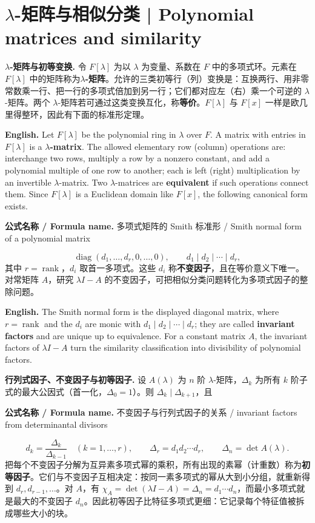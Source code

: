 \documentclass[UTF8,11pt,a4paper]{ctexart}
\newcommand{\EN}[1]{\par\noindent\textbf{English.} #1\par}
\newcommand{\FORMULA}[2]{\par\noindent\textbf{公式名称 / Formula name.} #1 / #2\par}
\begin{document}
\section[\texorpdfstring{$\lambda$}{lambda}-矩阵与相似分类]{\texorpdfstring{$\lambda$}{lambda}-矩阵与相似分类 | Polynomial matrices and similarity}
\noindent\textbf{$\lambda$-矩阵与初等变换.} 令 $F[\lambda]$ 为以 $\lambda$ 为变量、系数在 $F$ 中的多项式环。元素在 $F[\lambda]$ 中的矩阵称为\textbf{$\lambda$-矩阵}。允许的三类初等行（列）变换是：互换两行、用非零常数乘一行、把一行的多项式倍加到另一行；它们都对应左（右）乘一个可逆的 $\lambda$-矩阵。两个 $\lambda$-矩阵若可通过这类变换互化，称\textbf{等价}。$F[\lambda]$ 与 $F[x]$ 一样是欧几里得整环，因此有下面的标准形定理。
\EN{Let $F[\lambda]$ be the polynomial ring in $\lambda$ over $F$. A matrix with entries in $F[\lambda]$ is a \textbf{$\lambda$-matrix}. The allowed elementary row (column) operations are: interchange two rows, multiply a row by a nonzero constant, and add a polynomial multiple of one row to another; each is left (right) multiplication by an invertible $\lambda$-matrix. Two $\lambda$-matrices are \textbf{equivalent} if such operations connect them. Since $F[\lambda]$ is a Euclidean domain like $F[x]$, the following canonical form exists.}
\FORMULA{多项式矩阵的 Smith 标准形}{Smith normal form of a polynomial matrix}
\[
\operatorname{diag}(d_1,\dots,d_r,0,\dots,0),\qquad d_1\mid d_2\mid\cdots\mid d_r,
\]
其中 $r=\operatorname{rank}$，$d_i$ 取首一多项式。这些 $d_i$ 称\textbf{不变因子}，且在等价意义下唯一。对常矩阵 $A$，研究 $\lambda I-A$ 的不变因子，可把相似分类问题转化为多项式因子的整除问题。
\EN{The Smith normal form is the displayed diagonal matrix, where $r=\operatorname{rank}$ and the $d_i$ are monic with $d_1\mid d_2\mid\cdots\mid d_r$; they are called \textbf{invariant factors} and are unique up to equivalence. For a constant matrix $A$, the invariant factors of $\lambda I-A$ turn the similarity classification into divisibility of polynomial factors.}
\noindent\textbf{行列式因子、不变因子与初等因子.} 设 $A(\lambda)$ 为 $n$ 阶 $\lambda$-矩阵，$\Delta_k$ 为所有 $k$ 阶子式的最大公因式（首一化，$\Delta_0=1$）。则 $\Delta_k\mid\Delta_{k+1}$，且
\FORMULA{不变因子与行列式因子的关系}{invariant factors from determinantal divisors}
\[
d_k=\frac{\Delta_k}{\Delta_{k-1}}\quad(k=1,\dots,r),\qquad
\Delta_r=d_1d_2\cdots d_r,\qquad \Delta_n=\det A(\lambda).
\]
把每个不变因子分解为互异素多项式幂的乘积，所有出现的素幂（计重数）称为\textbf{初等因子}。它们与不变因子互相决定：按同一素多项式的幂从大到小分组，就重新得到 $d_r,d_{r-1},\dots$。对 $A$，有 $\chi_A=\det(\lambda I-A)=\Delta_n=d_1\cdots d_n$，而最小多项式就是最大的不变因子 $d_n$。因此初等因子比特征多项式更细：它记录每个特征值被拆成哪些大小的块。
\end{document}
